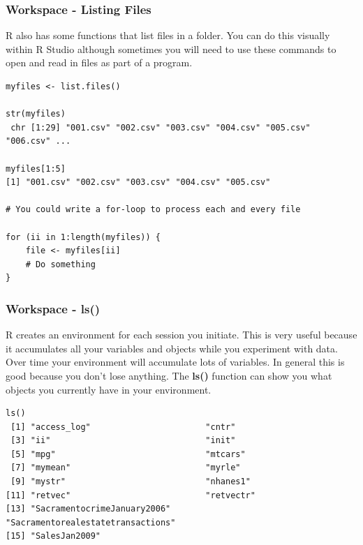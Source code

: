 \documentclass{beamer}
\begin{document}

\begin{frame}[fragile]
\frametitle{Workspace - Listing Files}
R also has some functions that list files in a folder. You can do this visually within R Studio although sometimes you will need to use these commands to open and read in files as part of a program.
\footnotesize
\begin{verbatim}
myfiles <- list.files()

str(myfiles)
 chr [1:29] "001.csv" "002.csv" "003.csv" "004.csv" "005.csv" "006.csv" ... 

myfiles[1:5]
[1] "001.csv" "002.csv" "003.csv" "004.csv" "005.csv"
 
# You could write a for-loop to process each and every file

for (ii in 1:length(myfiles)) {
    file <- myfiles[ii]
    # Do something 
} 
\end{verbatim}
\end{frame}


\begin{frame}[fragile]
\frametitle{Workspace - ls()}
R creates an environment for each session you initiate. This is very useful because it accumulates all your variables and objects while you experiment with data. 
\newline
\\
Over time your environment will accumulate lots of variables. In general this is good because you don't lose anything. The \textbf{ls()} function can show you what objects you currently have in your environment.
\scriptsize
\begin{verbatim}
ls()
 [1] "access_log"                       "cntr"                            
 [3] "ii"                               "init"                            
 [5] "mpg"                              "mtcars"                          
 [7] "mymean"                           "myrle"                           
 [9] "mystr"                            "nhanes1"                         
[11] "retvec"                           "retvectr"                        
[13] "SacramentocrimeJanuary2006"       "Sacramentorealestatetransactions"
[15] "SalesJan2009"                    
\end{verbatim}
\end{frame}
\end{document}
